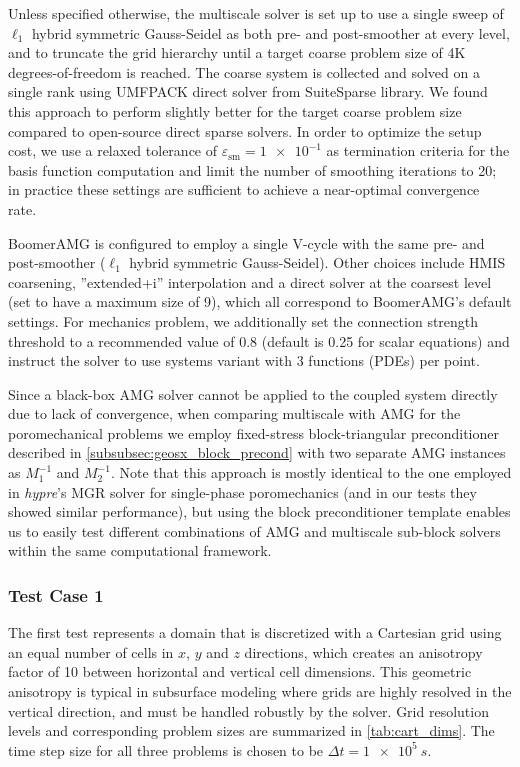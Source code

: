 Unless specified otherwise, the multiscale solver is set up to use a single sweep of $\ell_1$ hybrid symmetric Gauss-Seidel as both pre- and post-smoother at every level, and to truncate the grid hierarchy until a target coarse problem size of 4K degrees-of-freedom is reached.   The coarse system is collected and solved on a single rank using UMFPACK direct solver from SuiteSparse library.   We found this approach to perform slightly better for the target coarse problem size compared to open-source direct sparse solvers.   In order to optimize the setup cost, we use a relaxed tolerance of $\varepsilon_{\text{sm}} = \num{1e-1}$ as termination criteria for the basis function computation and limit the number of smoothing iterations to 20; in practice these settings are sufficient to achieve a near-optimal convergence rate.

BoomerAMG is configured to employ a single V-cycle with the same pre- and post-smoother ($\ell_1$ hybrid symmetric Gauss-Seidel).   Other choices include HMIS coarsening, ''extended+i'' interpolation and a direct solver at the coarsest level (set to have a maximum size of 9), which all correspond to BoomerAMG's default settings.   For mechanics problem, we additionally set the connection strength threshold to a recommended value of 0.8 (default is 0.25 for scalar equations) and instruct the solver to use systems variant with 3 functions (PDEs) per point.

Since a black-box AMG solver cannot be applied to the coupled system directly due to lack of convergence, when comparing multiscale with AMG for the poromechanical problems we employ fixed-stress block-triangular preconditioner described in \cref{subsubsec:geosx_block_precond} with two separate AMG instances as $M_1^{-1}$ and $M_2^{-1}$.   Note that this approach is mostly identical to the one employed in \textit{hypre}'s MGR solver \cite{Bui2020} for single-phase poromechanics (and in our tests they showed similar performance), but using the block preconditioner template enables us to easily test different combinations of AMG and multiscale sub-block solvers within the same computational framework.

\subsubsection{Test Case 1}

The first test represents a  domain that is discretized with a Cartesian grid using an equal number of cells in $x$, $y$ and $z$ directions, which creates an anisotropy factor of 10 between horizontal and vertical cell dimensions.   This geometric anisotropy is typical in subsurface modeling where grids are highly resolved in the vertical direction, and must be handled robustly by the solver.   Grid resolution levels and corresponding problem sizes are summarized in \cref{tab:cart_dims}.   The time step size for all three problems is chosen to be $\Delta t = \qty{1e5}{s}$.

